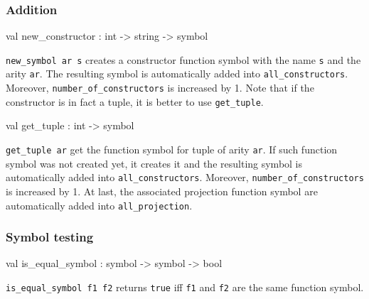 \subsubsection{Addition}




\label{val:Term.new-underscoreconstructor}\begin{ocamldoccode}
val new_constructor : int -> string -> symbol
\end{ocamldoccode}
\begin{ocamldocdescription}
{\tt{new\_symbol ar s}} creates a constructor function symbol with the name {\tt{s}} and the arity {\tt{ar}}.
    The resulting symbol is automatically added into {\tt{all\_constructors}}. 
    Moreover, {\tt{number\_of\_constructors}} is increased by 1.
    Note that if the constructor is in fact a tuple, it is better to use {\tt{get\_tuple}}.


\end{ocamldocdescription}




\label{val:Term.get-underscoretuple}\begin{ocamldoccode}
val get_tuple : int -> symbol
\end{ocamldoccode}
\begin{ocamldocdescription}
{\tt{get\_tuple ar}} get the function symbol for tuple of arity {\tt{ar}}.
    If such function symbol was not created yet, it creates it and 
    the resulting symbol is automatically added into {\tt{all\_constructors}}.
    Moreover, {\tt{number\_of\_constructors}} is increased by 1.
    At last, the associated projection function symbol are automatically added into {\tt{all\_projection}}.


\end{ocamldocdescription}




\subsubsection{Symbol testing}




\label{val:Term.is-underscoreequal-underscoresymbol}\begin{ocamldoccode}
val is_equal_symbol : symbol -> symbol -> bool
\end{ocamldoccode}
\begin{ocamldocdescription}
{\tt{is\_equal\_symbol f1 f2}} returns {\tt{true}} iff {\tt{f1}} and {\tt{f2}} are the same function symbol.


\end{ocamldocdescription}




